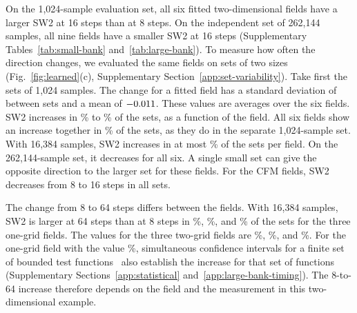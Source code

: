 On the 1,024-sample evaluation set, all six fitted
two-dimensional fields have a larger SW2 at 16 steps than at 8 steps.
On the independent set of 262,144 samples, all nine fields have
a smaller SW2 at 16 steps (Supplementary Tables~\ref{tab:small-bank}
and~\ref{tab:large-bank}). To measure how often the direction changes, we evaluated the same
fields on \VarSetCount{} sets of two sizes
(Fig.~\ref{fig:learned}(c), Supplementary
Section~\ref{app:set-variability}). Take first the sets of 1,024
samples. The change for a fitted field has a standard deviation of
\VarSmallChangeSd{} between sets and a mean of $-0.011$.
These values are averages over the six fields. SW2 increases in
\VarSmallFractionMin{}\% to \VarSmallFractionMax{}\% of the
\VarSmallSets{} sets, as a function of the field. All six fields show
an increase together in \VarSmallAllSix{}\% of the sets, as they do in the separate 1,024-sample set. With 16,384 samples,
SW2 increases in at most \VarMediumFractionMax{}\% of the
\VarMediumSets{} sets per field. On the 262,144-sample set, it
decreases for all six. A single small set can give the opposite
direction to the larger set for these fields. For the CFM fields, SW2
decreases from 8 to 16 steps in all sets.

The change from 8 to 64 steps differs between the fields. With 16,384
samples, SW2 is larger at 64 steps than at 8 steps in
\VarMediumLongOneA{}\%, \VarMediumLongOneB{}\%, and
\VarMediumLongOneC{}\% of the sets for the three one-grid fields. The
values for the three two-grid fields are \VarMediumLongTwoA{}\%,
\VarMediumLongTwoB{}\%, and \VarMediumLongTwoC{}\%. For the one-grid field with the value
\VarMediumLongOneA{}\%, simultaneous
confidence intervals for a finite set of bounded test
functions~\citep{hoeffding1963probability,maurer2009bernstein,muller1997integral}
also establish the increase for that set of functions (Supplementary
Sections~\ref{app:statistical} and~\ref{app:large-bank-timing}). The 8-to-64 increase therefore depends on the field and the
measurement in this two-dimensional example.
